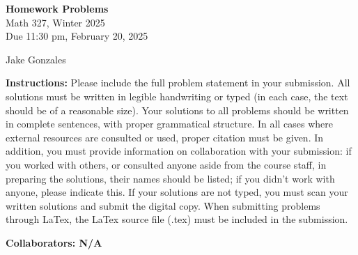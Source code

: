\documentclass [10pt]{article}
\newcommand{\jg}[1]{{\color{blue} #1}}
\begin{document}
\begin{center}
{\bf Homework Problems}\\
Math 327, Winter 2025\\
Due 11:30 pm, February 20, 2025
\end{center}

\begin{center}
\jg{
    Jake Gonzales}
\end{center}

{\bf Instructions:} Please include the full problem statement in your submission.
All solutions must be written in legible handwriting
or typed (in each case, the text should be of a reasonable size). Your solutions to
all problems should be written in complete sentences, with proper grammatical
structure.
In all cases where external resources are consulted or used, proper citation must
be given. In addition,
you must provide information on collaboration with your submission: if you worked with others,
or consulted anyone aside from the course staff, in preparing the solutions, their
names should be
listed; if you didn't work with anyone, please indicate this.
If your solutions are not typed, you must scan your written solutions and submit
the digital copy. When submitting problems through LaTex, the LaTex source file
(.tex) must be included in the submission.

\jg{
\textbf{Collaborators: N/A }
}
\end{document}
